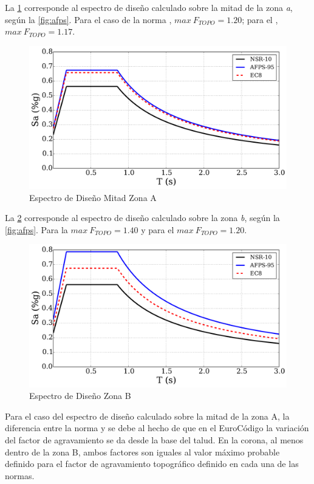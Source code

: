 \documentclass[spanish,letterpaper,12pt,twoside,openany]{article}
\begin{document}
La \cref{fig:espmitlad} corresponde al espectro de diseño calculado sobre la mitad de la zona \textit{a}, según la \cref{fig:afps}. Para el caso de la norma \citeauthor{AFPS1995}, $max\ F_{TOPO} = 1.20$; para el \citeauthor{EC8}, $max\ F_{TOPO}=1.17$.
%
\begin{figure}[H]
	\centering
	\includegraphics[width=10 cm]{img/EspectroZonaA.pdf}
	\vspace{-.5 cm}
	\caption{Espectro de Diseño Mitad Zona A}
	\label{fig:espmitlad}
\end{figure}
%
La \cref{fig:espcor} corresponde al espectro de diseño calculado sobre la zona \textit{b}, según la \cref{fig:afps}. Para la \citeauthor{AFPS1995} $max\ F_{TOPO}=1.40$ y para el \citeauthor{EC8} $max\ F_{TOPO}=1.20$.
%
\begin{figure}[H]
	\centering
	\includegraphics[width=10 cm]{img/EspectroZonaB.pdf}
	\vspace{-.5 cm}
	\caption{Espectro de Diseño Zona B}
	\label{fig:espcor}
\end{figure}
%
Para el caso del espectro de diseño calculado sobre la mitad de la zona A, la diferencia entre la norma \citeauthor{AFPS1995} y \citeauthor{EC8} se debe al hecho de que en el EuroCódigo la variación del factor de agravamiento se da desde la base del talud. En la corona, al menos dentro de la zona B, ambos factores son iguales al valor máximo probable definido para el factor de agravamiento topográfico definido en cada una de las normas.
\end{document}
